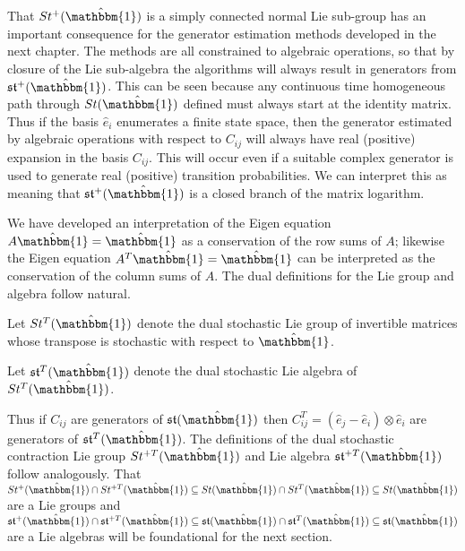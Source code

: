 That $St^{+}(\hat{\mathbbm{1}})$ is a simply connected normal Lie sub-group has 
an important consequence for the generator estimation methods developed in the 
next chapter. The methods are all constrained to algebraic operations, so that
by closure of the Lie sub-algebra the algorithms will always result in 
generators from $\mathfrak{st}^{+}(\hat{\mathbbm{1}})$. This can be seen because 
any continuous time homogeneous path through $St(\hat{\mathbbm{1}})$ defined 
must always start at the identity matrix. Thus if the basis $\hat{e}_i$ 
enumerates a finite state space, then the generator estimated by algebraic 
operations with respect to $C_{ij}$ will always have real (positive) expansion 
in the basis $C_{ij}$. This will occur even if a suitable complex generator is 
used to generate real (positive) transition probabilities. We can interpret this 
as meaning that $\mathfrak{st}^{+}(\hat{\mathbbm{1}})$ is a closed branch of the 
matrix logarithm. 


We have developed an interpretation of the Eigen equation $A \hat{\mathbbm{1}} = \hat{\mathbbm{1}}$
as a conservation of the row sums of $A$; likewise the Eigen equation $A^T \hat{\mathbbm{1}} = \hat{\mathbbm{1}}$
can be interpreted as the conservation of the column sums of $A$. The dual 
definitions for the Lie group and algebra follow natural.

\begin{definition}
	Let $St^T(\hat{\mathbbm{1}})$ denote the dual stochastic Lie group of 
	invertible matrices whose transpose is stochastic with respect to $\hat{\mathbbm{1}}$.
\end{definition}

\begin{definition}
	Let $\mathfrak{st}^T(\hat{\mathbbm{1}})$ denote the dual stochastic Lie 
	algebra of $St^T(\hat{\mathbbm{1}})$.
\end{definition}

Thus if $C_{ij}$ are generators of $\mathfrak{st}(\hat{\mathbbm{1}})$ then $C_{ij}^T = \left(\hat{e}_j - \hat{e}_i \right) \otimes \hat{e}_i$
are generators of $\mathfrak{st}^T(\hat{\mathbbm{1}})$. The definitions of the
dual stochastic contraction Lie group $St^{+T}(\hat{\mathbbm{1}})$ and Lie algebra $\mathfrak{st}^{+T}(\hat{\mathbbm{1}})$
follow analogously. That $St^{+}(\hat{\mathbbm{1}}) \cap St^{+T}(\hat{\mathbbm{1}}) \subseteq St(\hat{\mathbbm{1}}) \cap St^T(\hat{\mathbbm{1}}) \subseteq St(\hat{\mathbbm{1}})$ 
are a Lie groups and $\mathfrak{st}^{+}(\hat{\mathbbm{1}}) \cap \mathfrak{st}^{+T}(\hat{\mathbbm{1}}) \subseteq \mathfrak{st}(\hat{\mathbbm{1}}) \cap \mathfrak{st}^T(\hat{\mathbbm{1}}) \subseteq \mathfrak{st}(\hat{\mathbbm{1}})$ 
are a Lie algebras will be foundational for the next section.


